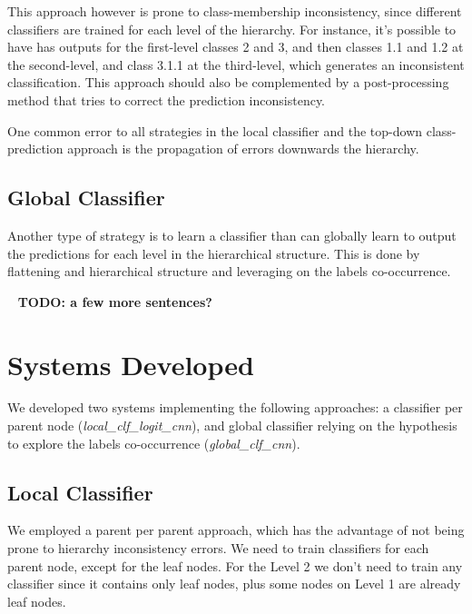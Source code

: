 \documentclass[11pt,a4paper]{article}
\begin{document}
This approach however is prone to class-membership inconsistency, since different classifiers are
trained for each level of the hierarchy. For instance, it's possible to have has outputs for the
first-level classes 2 and 3, and then classes 1.1 and 1.2 at the second-level, and class 3.1.1
at the third-level, which generates an inconsistent classification. This approach should also
be complemented by a post-processing method that tries to correct the prediction inconsistency.

One common error to all strategies in the local classifier and the top-down class-prediction
approach is the propagation of errors downwards the hierarchy.



\subsection{Global Classifier}

Another type of strategy is to learn a classifier than can globally learn to
output the predictions for each level in the hierarchical structure. This is
done by flattening and hierarchical structure and leveraging on the labels
co-occurrence.

\ \newline
\textbf{TODO: a few more sentences?}
\ \newline

\section{Systems Developed}\label{system}

We developed two systems implementing the following approaches: a classifier per
parent node (\textit{local\_clf\_logit\_cnn}), and global classifier relying
on the hypothesis to explore the labels co-occurrence (\textit{global\_clf\_cnn}).

\subsection{Local Classifier}

We employed a parent per parent approach, which has the advantage of not being
prone to hierarchy inconsistency errors. We need to train classifiers for each
parent node, except for the leaf nodes. For the Level 2 we don't need to train
any classifier since it contains only leaf nodes, plus some nodes on Level 1
are already leaf nodes.
\end{document}
